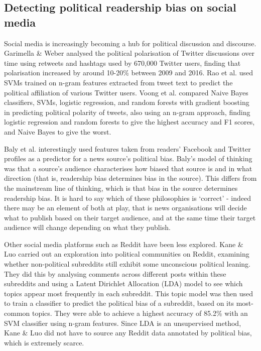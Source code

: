 \subsection{Detecting political readership bias on social media} \label{subsec:readership-bias-social-media}

Social media is increasingly becoming a hub for political discussion and discourse. Garimella \& Weber \cite{garimella} analysed the political polarisation of Twitter discussions over time using retweets and hashtags used by 670,000 Twitter users, finding that polarisation increased by around 10-20\% between 2009 and 2016. Rao et al. \cite{rao} used SVMs trained on n-gram features extracted from tweet text to predict the political affiliation of various Twitter users. Voong et al. \cite{voong} compared Naive Bayes classifiers, SVMs, logistic regression, and random forests with gradient boosting in predicting political polarity of tweets, also using an n-gram approach, finding logistic regression and random forests to give the highest accuracy and F1 scores, and Naive Bayes to give the worst.

Baly et al. \cite{baly-acl2020} interestingly used features taken from readers' Facebook and Twitter profiles as a predictor for a news source's political bias. Baly's model of thinking was that a source's audience characterises how biased that source is and in what direction (that is, readership bias determines bias in the source). This differs from the mainstream line of thinking, which is that bias in the source determines readership bias. It is hard to say which of these philosophies is `correct' - indeed there may be an element of both at play, that is news organisations will decide what to publish based on their target audience, and at the same time their target audience will change depending on what they publish.

Other social media platforms such as Reddit have been less explored. Kane \& Luo \cite{kane} carried out an exploration into political communities on Reddit, examining whether non-political subreddits still exhibit some unconscious political leaning. They did this by analysing comments across different posts within these subreddits and using a Latent Dirichlet Allocation (LDA) model to see which topics appear most frequently in each subreddit. This topic model was then used to train a classifier to predict the political bias of a subreddit, based on its most-common topics. They were able to achieve a highest accuracy of 85.2\% with an SVM classifier using n-gram features. Since LDA is an unsupervised method, Kane \& Luo did not have to source any Reddit data annotated by political bias, which is extremely scarce.

